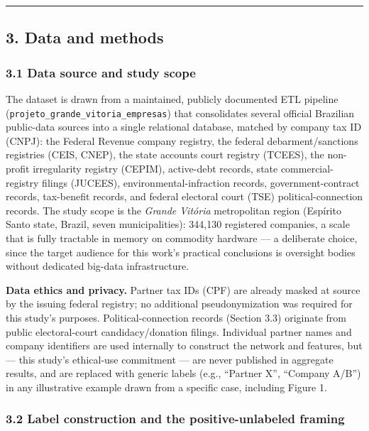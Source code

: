 \documentclass[11pt,]{article}
\begin{document}
\begin{center}\rule{0.5\linewidth}{0.5pt}\end{center}

\hypertarget{data-and-methods}{%
\subsection{3. Data and methods}\label{data-and-methods}}

\hypertarget{data-source-and-study-scope}{%
\subsubsection{3.1 Data source and study
scope}\label{data-source-and-study-scope}}

The dataset is drawn from a maintained, publicly documented ETL pipeline
(\texttt{projeto\_grande\_vitoria\_empresas}) that consolidates several
official Brazilian public-data sources into a single relational
database, matched by company tax ID (CNPJ): the Federal Revenue company
registry, the federal debarment/sanctions registries (CEIS, CNEP), the
state accounts court registry (TCEES), the non-profit irregularity
registry (CEPIM), active-debt records, state commercial-registry filings
(JUCEES), environmental-infraction records, government-contract records,
tax-benefit records, and federal electoral court (TSE)
political-connection records. The study scope is the \emph{Grande
Vitória} metropolitan region (Espírito Santo state, Brazil, seven
municipalities): 344,130 registered companies, a scale that is fully
tractable in memory on commodity hardware --- a deliberate choice, since
the target audience for this work's practical conclusions is oversight
bodies without dedicated big-data infrastructure.

\textbf{Data ethics and privacy.} Partner tax IDs (CPF) are already
masked at source by the issuing federal registry; no additional
pseudonymization was required for this study's purposes.
Political-connection records (Section 3.3) originate from public
electoral-court candidacy/donation filings. Individual partner names and
company identifiers are used internally to construct the network and
features, but --- this study's ethical-use commitment --- are never
published in aggregate results, and are replaced with generic labels
(e.g., ``Partner X'', ``Company A/B'') in any illustrative example drawn
from a specific case, including Figure 1.

\hypertarget{label-construction-and-the-positive-unlabeled-framing}{%
\subsubsection{3.2 Label construction and the positive-unlabeled
framing}\label{label-construction-and-the-positive-unlabeled-framing}}
\end{document}
